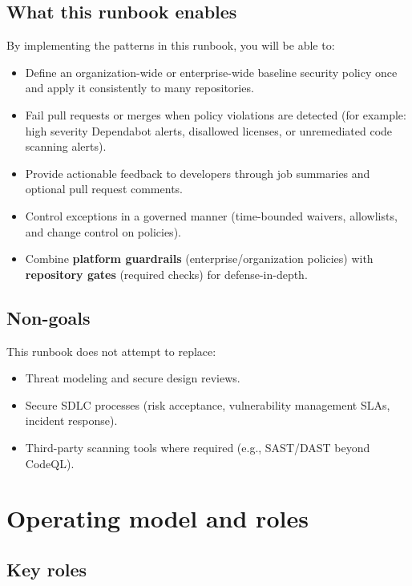\documentclass[11pt]{article}
\begin{document}
\subsection{What this runbook enables}

By implementing the patterns in this runbook, you will be able to:

\begin{itemize}[leftmargin=*]
  \item Define an organization-wide or enterprise-wide baseline security policy once and apply it consistently to many repositories.
  \item Fail pull requests or merges when policy violations are detected (for example: high severity Dependabot alerts, disallowed licenses, or unremediated code scanning alerts).
  \item Provide actionable feedback to developers through job summaries and optional pull request comments.
  \item Control exceptions in a governed manner (time-bounded waivers, allowlists, and change control on policies).
  \item Combine \textbf{platform guardrails} (enterprise/organization policies) with \textbf{repository gates} (required checks) for defense-in-depth.
\end{itemize}

\subsection{Non-goals}

This runbook does not attempt to replace:
\begin{itemize}[leftmargin=*]
  \item Threat modeling and secure design reviews.
  \item Secure SDLC processes (risk acceptance, vulnerability management SLAs, incident response).
  \item Third-party scanning tools where required (e.g., SAST/DAST beyond CodeQL).
\end{itemize}

\section{Operating model and roles}

\subsection{Key roles}
\end{document}
